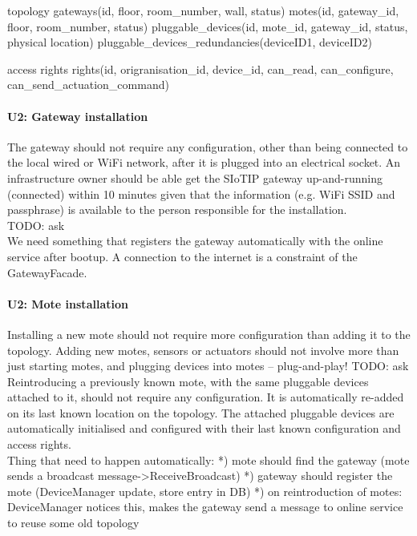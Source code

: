     topology
        gateways(id, floor, room_number, wall, status)
        motes(id, gateway_id, floor, room_number, status)
        pluggable_devices(id, mote_id, gateway_id, status, physical location)
        pluggable_devices_redundancies(deviceID1, deviceID2)

    access rights
        rights(id, origranisation_id, device_id, can_read, can_configure, can_send_actuation_command)

    \paragraph{U2: Gateway installation}
        The gateway should not require any configuration, other than being connected
        to the local wired or WiFi network, after it is plugged into an electrical
        socket. An infrastructure owner should be able get the SIoTIP gateway
        up-and-running (connected) within 10 minutes given that the information
        (e.g. WiFi SSID and passphrase) is available to the person responsible for
        the installation. \\
        TODO: ask \\
        We need something that registers the gateway automatically with the
        online service after bootup. A connection to the internet is a constraint
        of the GatewayFacade.

    \paragraph{U2: Mote installation}
        Installing a new mote should not require more configuration than adding it
        to the topology. Adding new motes, sensors or actuators should not involve
        more than just starting motes, and plugging devices into motes – plug-and-play! TODO: ask \\
        Reintroducing a previously known mote, with the same pluggable devices attached to it,
        should not require any configuration. It is automatically re-added on
        its last known location on the topology. The attached pluggable devices
        are automatically initialised and configured with their last known
        configuration and access rights. \\
        Thing that need to happen automatically:
        *) mote should find the gateway (mote sends a broadcast message->ReceiveBroadcast)
        *) gateway should register the mote (DeviceManager update, store entry in DB)
        *) on reintroduction of motes: DeviceManager notices this, makes the gateway send a message to online service to reuse some old topology

